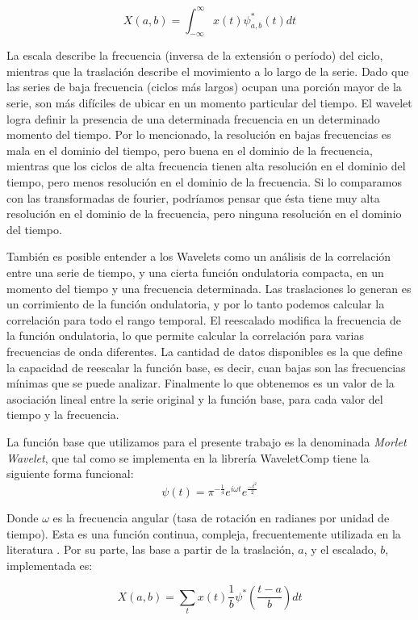 \documentclass[a4paper]{article}
\begin{document}
$$
X(a,b)=\int_{-\infty}^{\infty} x(t) \psi^*_{a,b}(t)dt
$$

La escala describe la frecuencia (inversa de la extensión o período) del ciclo, mientras que la traslación describe el movimiento a lo largo de la serie. Dado que las series de baja frecuencia (ciclos más largos) ocupan una porción mayor de la serie, son más difíciles de ubicar en un momento particular del tiempo. El wavelet logra definir la presencia de una determinada frecuencia en un determinado momento del tiempo. Por lo mencionado, la resolución en bajas frecuencias es mala en el dominio del tiempo, pero buena en el dominio de la frecuencia, mientras que los ciclos de alta frecuencia tienen alta resolución en el dominio del tiempo, pero menos resolución en el dominio de la frecuencia. Si lo comparamos con las transformadas de fourier, podríamos pensar que ésta tiene muy alta resolución en el dominio de la frecuencia, pero ninguna resolución en el dominio del tiempo. 

También es posible entender a los Wavelets como un análisis de la correlación entre una serie de tiempo, y una cierta función ondulatoria compacta, en un momento del tiempo y una frecuencia determinada. Las traslaciones lo generan es un corrimiento de la función ondulatoria, y por lo tanto podemos calcular la correlación para todo el rango temporal. El reescalado modifica la frecuencia de la función ondulatoria, lo que permite calcular la correlación para varias frecuencias de onda diferentes. La cantidad de datos disponibles es la que define la capacidad de reescalar la función base, es decir, cuan bajas son las frecuencias mínimas que se puede analizar. Finalmente lo que obtenemos es un valor de la asociación lineal entre la serie original y la función base, para cada valor del tiempo y la frecuencia.  

La función base que utilizamos para el presente trabajo es la denominada \textit{Morlet Wavelet}, que tal como se implementa en la librería WaveletComp \citep{Roesch2018} tiene la siguiente forma funcional:
$$
\psi(t)=\pi^{-\frac{1}{4}}e^{i\omega t}e^{\frac{-t^2}{2}}
$$

Donde $\omega$ es la frecuencia angular (tasa de rotación en radianes por unidad de tiempo). Esta es una función continua, compleja, frecuentemente utilizada en la literatura \citep{conraria2011continuous}. Por su parte, las base a partir de la traslación, $a$, y el escalado, $b$, implementada es:

$$
X(a,b)=\sum_{t} x(t)   \frac{1}{b} \psi^*\left(\frac{t-a}{b}\right)dt
$$
\end{document}
